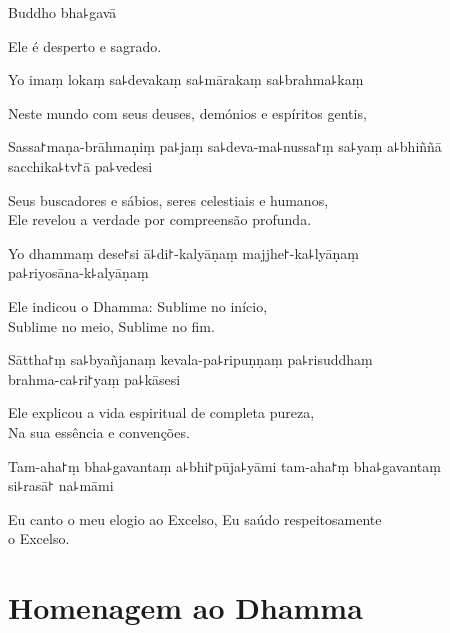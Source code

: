Buddho bha꜕gavā

\begin{english}
  Ele é desperto e sagrado.
\end{english}

Yo imaṃ lokaṃ sa꜕devakaṃ sa꜕mārakaṃ sa꜕brahma꜕kaṃ

\begin{english}
  Neste mundo com seus deuses, demónios e espíritos gentis,
\end{english}

Sassa꜓maṇa-brāhmaṇiṃ pa꜕jaṃ sa꜕deva-ma꜕nussa꜓ṃ sa꜕yaṃ a꜕bhiññā sacchika꜕tv꜓ā pa꜕vedesi

\begin{english}
  Seus buscadores e sábios, seres celestiais e humanos,\\Ele revelou a verdade por compreensão profunda.
\end{english}

Yo dhammaṃ dese꜓si ā꜕di꜓-kalyāṇaṃ majjhe꜓-ka꜕lyāṇaṃ \\pa꜕riyosāna-k꜕alyāṇaṃ

\begin{english}
  Ele indicou o Dhamma: Sublime no início, \\Sublime no meio, Sublime no fim.
\end{english}

Sāttha꜓ṃ sa꜕byañjanaṃ kevala-pa꜕ripuṇṇaṃ pa꜕risuddhaṃ \\brahma-ca꜕ri꜓yaṃ pa꜕kāsesi

\begin{english}
  Ele explicou a vida espiritual de completa pureza,\\Na sua essência e convenções.
\end{english}

Tam-aha꜓ṃ bha꜕gavantaṃ a꜕bhi꜓pūja꜕yāmi tam-aha꜓ṃ bha꜕gavantaṃ \\si꜕rasā꜓ na꜕māmi

\begin{english}
  Eu canto o meu elogio ao Excelso, Eu saúdo respeitosamente \\o Excelso.
\end{english}

\clearpage

\chapter{Homenagem ao Dhamma}

\begin{leader}
\end{leader}

